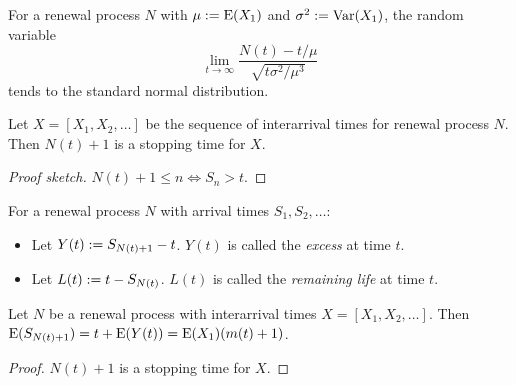 \documentclass[a4paper, 12pt, fleqn]{article}
\begin{document}
\begin{theorem}
For a renewal process $N$ with $\mu := \operatorname*{E}(X_1)$ and $\sigma^2 := \operatorname*{Var}(X_1)$,
the random variable
\[ \lim_{t \to \infty} \frac{N(t) - t/\mu}{\sqrt{t\sigma^2/\mu^3}} \]
tends to the standard normal distribution.
\end{theorem}

\begin{lemma}
Let $X = [X_1, X_2, \ldots]$ be the sequence of interarrival times for renewal process $N$.
Then $N(t)+1$ is a stopping time for $X$.
\end{lemma}
\begin{proof}[Proof sketch]
$N(t)+1 \le n \iff S_n > t$.
\end{proof}

\begin{definition}
For a renewal process $N$ with arrival times $S_1, S_2, \ldots$:
\begin{itemize}
\item Let $Y(t) := S_{N(t)+1}-t$. $Y(t)$ is called the \emph{excess} at time $t$.
\item Let $L(t) := t - S_{N(t)}$. $L(t)$ is called the \emph{remaining life} at time $t$.
\end{itemize}
\end{definition}

\begin{lemma}
Let $N$ be a renewal process with interarrival times $X = [X_1, X_2, \ldots]$.
Then $\operatorname*{E}(S_{N(t)+1}) = t + \operatorname*{E}(Y(t)) = \operatorname*{E}(X_1)(m(t)+1)$.
\end{lemma}
\begin{proof}
$N(t)+1$ is a stopping time for $X$.
\end{proof}
\end{document}
